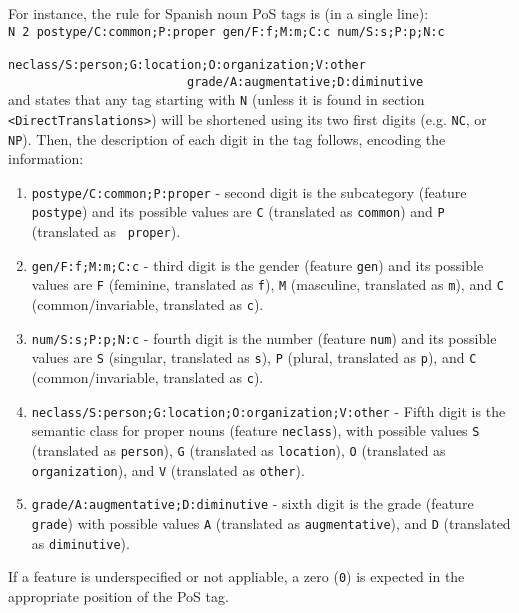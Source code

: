 \documentclass[a4paper]{book}
\begin{document}
\begin{itemize}
    For instance, the rule for Spanish noun PoS tags is (in a single line):\\
    \verb#N 2 postype/C:common;P:proper gen/F:f;M:m;C:c num/S:s;P:p;N:c#\\
    \verb#                         neclass/S:person;G:location;O:organization;V:other#\\
    \verb#                         grade/A:augmentative;D:diminutive#\\
    and states that any tag starting with {\tt N} (unless it is 
    found in section \verb#<DirectTranslations>#) will be shortened
    using its two first digits (e.g. {\tt NC}, or {\tt NP}). Then, the
    description of each digit in the tag follows, encoding the information:
    \begin{enumerate}
     \item {\tt postype/C:common;P:proper} - second digit is the
       subcategory (feature {\tt postype}) and its possible values are {\tt C}
       (translated as {\tt common}) and {\tt P} (translated as {\tt
         proper}).
     \item {\tt gen/F:f;M:m;C:c} - third digit is the gender (feature {\tt gen}) and 
        its possible values are {\tt F} (feminine, translated as {\tt f}), {\tt M} (masculine,
        translated as {\tt m}), and {\tt C} (common/invariable, translated as {\tt c}).
     \item {\tt num/S:s;P:p;N:c} - fourth digit is the number (feature {\tt num}) and its 
       possible values are {\tt S} (singular, translated as {\tt s}), {\tt P} (plural,
        translated as {\tt p}), and {\tt C} (common/invariable, translated as {\tt c}).       
     \item {\tt neclass/S:person;G:location;O:organization;V:other} -
       Fifth digit is the semantic class for proper nouns (feature
       {\tt neclass}), with possible values {\tt S} (translated as
       {\tt person}), {\tt G} (translated as {\tt location}), {\tt O}
       (translated as {\tt organization}), and {\tt V} (translated as
       {\tt other}).
     \item {\tt grade/A:augmentative;D:diminutive} - sixth digit is
       the grade (feature {\tt grade}) with possible values {\tt A}
       (translated as {\tt augmentative}), and {\tt D} (translated as
       {\tt diminutive}).
    \end{enumerate}
    
    If a feature is underspecified or not appliable, a zero ({\tt 0})
    is expected in the appropriate position of the PoS tag.


\end{itemize}
\end{document}
